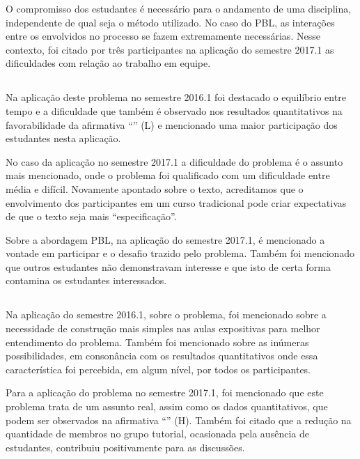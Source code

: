 O compromisso dos estudantes é necessário para
o andamento de uma disciplina, independente de qual seja
o método utilizado.
No caso do \ac{PBL}, as interações entre os envolvidos no processo
se fazem extremamente necessárias.
Nesse contexto,
foi citado por três participantes na aplicação do semestre 2017.1 as dificuldades
com relação ao trabalho em equipe.

\subsection{\ProblemaC}

Na aplicação deste problema no semestre 2016.1
foi destacado o equilíbrio entre tempo e a dificuldade
que também é observado nos resultados quantitativos
na favorabilidade da afirmativa ``\LikertPL'' (L)
e mencionado uma maior participação
dos estudantes nesta aplicação.

No caso da aplicação no semestre 2017.1 a dificuldade
do problema é o assunto mais mencionado, onde o problema foi
qualificado com um dificuldade entre média e difícil.
Novamente apontado sobre o texto, acreditamos que o
envolvimento dos participantes em um curso
tradicional pode criar expectativas de que o texto
seja mais ``especificação''.

Sobre a abordagem \ac{PBL}, na aplicação do semestre 2017.1,
é mencionado a vontade em participar e o desafio trazido
pelo problema.
Também foi mencionado que outros estudantes não
demonstravam interesse e que isto de certa forma
contamina os estudantes interessados.

\subsection{\ProblemaD}

Na aplicação do semestre 2016.1, sobre o problema, foi mencionado
sobre a necessidade de construção mais simples nas aulas
expositivas para melhor entendimento do problema.
Também foi mencionado sobre as inúmeras possibilidades, em consonância
com os resultados quantitativos onde essa característica foi
percebida, em algum nível, por todos os participantes.

Para a aplicação do problema no semestre 2017.1, foi mencionado
que este problema trata de um assunto real, assim como
os dados quantitativos, que podem ser observados
na afirmativa ``\LikertPH'' (H).
Também foi citado que a redução na quantidade de membros no grupo
tutorial, ocasionada pela ausência de estudantes, contribuiu
positivamente para as discussões.

